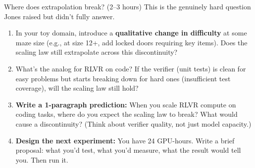 \begin{exercise}{Where does extrapolation break? (2--3 hours)}
This is the genuinely hard question Jones raised but didn't fully answer.

\begin{enumerate}
  \item In your toy domain, introduce a \textbf{qualitative change in difficulty} at some maze size (e.g., at size 12+, add locked doors requiring key items). Does the scaling law still extrapolate across this discontinuity?
  \item What's the analog for RLVR on code? If the verifier (unit tests) is clean for easy problems but starts breaking down for hard ones (insufficient test coverage), will the scaling law still hold?
  \item \textbf{Write a 1-paragraph prediction:} When you scale RLVR compute on coding tasks, where do you expect the scaling law to break? What would cause a discontinuity? (Think about verifier quality, not just model capacity.)
  \item \textbf{Design the next experiment:} You have 24 GPU-hours. Write a brief proposal: what you'd test, what you'd measure, what the result would tell you. Then run it.
\end{enumerate}
\end{exercise}

